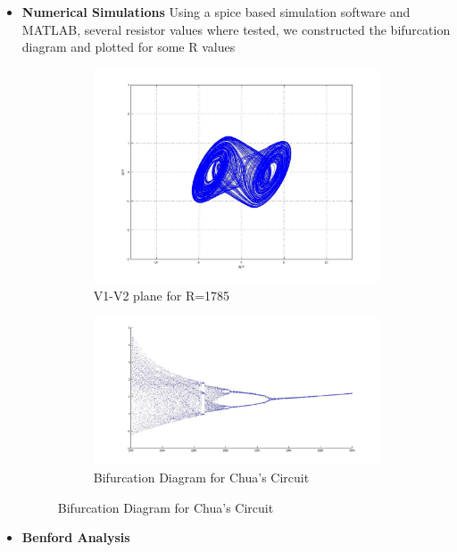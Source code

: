 \begin{itemize}
   \item \textbf{Numerical Simulations}
   Using a spice based simulation software and MATLAB, several resistor values where tested, we constructed the bifurcation diagram and plotted for some R values
\begin{figure}
         \centering
            \begin{subfigure}[b]{0.4\textwidth}
            \includegraphics[width=\textwidth]{imagenes/2-benford/1785.jpg}
            \caption{V1-V2 plane for R=1785}
            \end{subfigure}
            \begin{subfigure}[b]{0.4\textwidth}
            \includegraphics[width=\textwidth]{imagenes/2-benford/bifurcation_chua.jpg}
            \caption{Bifurcation Diagram for Chua's Circuit}
            \end{subfigure}
\end{figure}
   \item \textbf{Benford Analysis}

\end{itemize}
